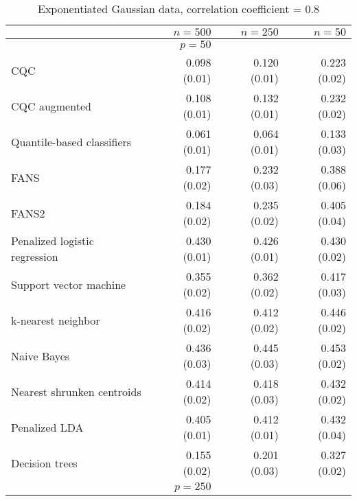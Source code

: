\begin{table}[p]
  \centering
  \caption{Exponentiated Gaussian data, correlation coefficient = 0.8}
  \label{tab:exp-gauss-corr08}
  \vspace{5mm}
  
  \begin{adjustbox}{max size={\textwidth}{10cm}}
    \begin{tabular}{l@{\extracolsep{15mm}}rrr}
      
      \hline
      & $n=500$ & $n=250$ & $n=50$ \\ 
      \hline
      & $p = 50$ \\
      \hline

      CQC & 0.098 (0.01) & 0.120 (0.01) & 0.223 (0.02) \\ 
      CQC augmented & 0.108 (0.01) & 0.132 (0.01) & 0.232 (0.02) \\ 
      Quantile-based classifiers & 0.061 (0.01) & 0.064 (0.01) & 0.133 (0.03) \\ 
      FANS  & 0.177 (0.02) & 0.232 (0.03) & 0.388 (0.06) \\
      FANS2 & 0.184 (0.02) & 0.235 (0.02) & 0.405 (0.04) \\
      Penalized logistic regression & 0.430 (0.01) & 0.426 (0.01) & 0.430 (0.02) \\ 
      Support vector machine & 0.355 (0.02) & 0.362 (0.02) & 0.417 (0.03) \\ 
      k-nearest neighbor & 0.416 (0.02) & 0.412 (0.02) & 0.446 (0.02) \\ 
      Naive Bayes & 0.436 (0.03) & 0.445 (0.03) & 0.453 (0.02) \\ 
      Nearest shrunken centroids & 0.414 (0.02) & 0.418 (0.03) & 0.432 (0.02) \\ 
      Penalized LDA & 0.405 (0.01) & 0.412 (0.01) & 0.432 (0.04) \\ 
      Decision trees & 0.155 (0.02) & 0.201 (0.03) & 0.327 (0.02) \\ [2ex]

      \hline
      & $p = 250$ \\
      \hline


\end{tabular}
\end{adjustbox}
\end{table}
